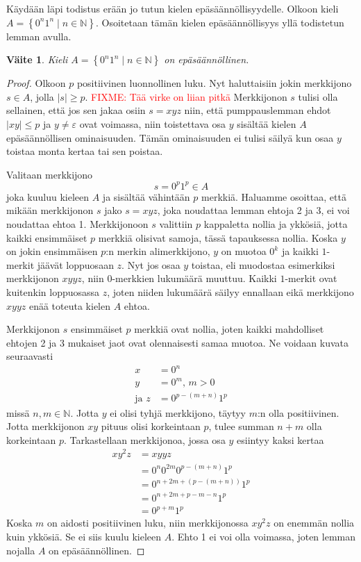 \documentclass[a4paper,11pt]{article}
\newtheorem*{claim}{Väite}
\theoremstyle{definition}
\newcommand{\set}[1]{{\left\{ #1 \right\}}}
\newcommand{\Nat}{\mathbb{N}}
\newcommand{\fixme}[1]{\textcolor{red}{FIXME: #1}}
\begin{document}
Käydään läpi todistus erään jo tutun kielen epäsäännöllisyydelle.
Olkoon kieli $A = \set{0^n1^n \mid n \in \Nat}$. Osoitetaan tämän
kielen epäsäännöllisyys yllä todistetun lemman avulla.
%
\begin{claim}
    Kieli $A = \set{0^n1^n \mid n \in \Nat}$ on epäsäännöllinen.
\end{claim}
\begin{proof}
    Olkoon $p$ positiivinen luonnollinen luku. Nyt haluttaisiin jokin
    merkkijono $s \in A$, jolla $|s| \geq p$. \fixme{Tää virke on liian pitkä} Merkkijonon $s$ tulisi olla
    sellainen, että jos sen jakaa osiin $s = xyz$ niin, että pumppauslemman
    ehdot $|xy| \leq p$ ja $y \neq \varepsilon$ ovat voimassa, niin toistettava
    osa $y$ sisältää kielen $A$ epäsäännöllisen ominaisuuden. Tämän
    ominaisuuden ei tulisi säilyä kun osaa $y$ toistaa monta kertaa tai sen
    poistaa.

    Valitaan merkkijono
    \begin{equation*}
        s = 0^p1^p \in A
    \end{equation*}
    joka kuuluu kieleen $A$ ja sisältää vähintään $p$ merkkiä. Haluamme
    osoittaa, että mikään merkkijonon $s$ jako $s = xyz$, joka noudattaa lemman
    ehtoja 2 ja 3, ei voi noudattaa ehtoa 1.  Merkkijonoon $s$ valittiin $p$
    kappaletta nollia ja ykkösiä, jotta kaikki ensimmäiset $p$ merkkiä olisivat
    samoja, tässä tapauksessa nollia.  Koska $y$ on jokin ensimmäisen $p$:n
    merkin alimerkkijono, $y$ on muotoa $0^k$ ja kaikki $1$-merkit jäävät
    loppuosaan $z$. Nyt jos osaa $y$ toistaa, eli muodostaa esimerkiksi
    merkkijonon $xyyz$, niin $0$-merkkien lukumäärä muuttuu. Kaikki $1$-merkit
    ovat kuitenkin loppuosassa $z$, joten niiden lukumäärä säilyy ennallaan
    eikä merkkijono $xyyz$ enää toteuta kielen $A$ ehtoa.

    Merkkijonon $s$ ensimmäiset $p$ merkkiä ovat nollia, joten kaikki
    mahdolliset ehtojen 2 ja 3 mukaiset jaot ovat olennaisesti samaa muotoa.
    Ne voidaan kuvata seuraavasti
    \begin{align*}
      x & = 0^n \\
      y & = 0^m\text{, } m > 0 \\
      \text{ja } z & = 0^{p-(m+n)}1^p
    \end{align*}
    missä $n,m \in \Nat$. Jotta $y$ ei
    olisi tyhjä merkkijono, täytyy $m$:n olla positiivinen. Jotta merkkijonon
    $xy$ pituus olisi korkeintaan $p$, tulee summan $n + m$ olla korkeintaan
    $p$.  Tarkastellaan merkkijonoa, jossa osa $y$ esiintyy kaksi kertaa
    \begin{align*}
      xy^2z & = xyyz \\
      & = 0^n0^{2m}0^{p-(m+n)}1^p \\
      & = 0^{n+2m+(p-(m+n))}1^p \\
      & = 0^{n+2m+p-m-n}1^p \\
      & = 0^{p+m}1^p
    \end{align*}
    Koska $m$ on aidosti positiivinen luku, niin merkkijonossa $xy^2z$ on
    enemmän nollia kuin ykkösiä. Se ei siis kuulu kieleen $A$. Ehto 1 ei
    voi olla voimassa, joten lemman nojalla $A$ on epäsäännöllinen.
\end{proof}
\end{document}
